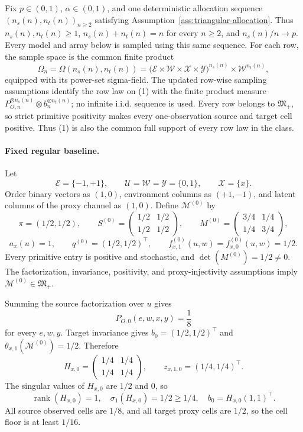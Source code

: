 Fix \(p\in(0,1)\), \(\alpha\in(0,1)\), and one deterministic allocation sequence \((n_s(n),n_t(n))_{n\ge2}\) satisfying Assumption~\ref{ass:triangular-allocation}.  Thus \(n_s(n),n_t(n)\ge1\), \(n_s(n)+n_t(n)=n\) for every \(n\ge2\), and \(n_s(n)/n\to p\).  Every model and array below is sampled using this same sequence.  For each row, the sample space is the common finite product
\[
\Omega_n=\Omega(n_s(n),n_t(n))
=\bigl(\mathcal E\times\mathcal W\times\mathcal X\times\mathcal Y\bigr)^{n_s(n)}
\times\mathcal W^{n_t(n)},
\tag{1}
\]
equipped with its power-set sigma-field.  The updated row-wise sampling assumptions identify the row law on (1) with the finite product measure \(P_{O,n}^{\otimes n_s(n)}\otimes b_n^{\otimes n_t(n)}\); no infinite i.i.d. sequence is used.
Every row belongs to \(\mathfrak M_{+}\), so strict primitive positivity makes every one-observation source and target cell positive.  Thus (1) is also the common full support of every row law in the class.

\paragraph{Fixed regular baseline.}
Let
\[
\mathcal E=\{-1,+1\},\qquad
\mathcal U=\mathcal W=\mathcal Y=\{0,1\},\qquad
\mathcal X=\{x\}.
\]
Order binary vectors as \((1,0)\), environment columns as \((+1,-1)\), and latent columns of the proxy channel as \((1,0)\).  Define \(\mathcal M^{(0)}\) by
\[
\pi=(1/2,1/2),\qquad
S^{(0)}=\begin{pmatrix}1/2&1/2\\1/2&1/2\end{pmatrix},\qquad
M^{(0)}=\begin{pmatrix}3/4&1/4\\1/4&3/4\end{pmatrix},
\]
\[
a_x(u)=1,\qquad q^{(0)}=(1/2,1/2)^{\top},\qquad
f^{(0)}_{x,1}(u,w)=f^{(0)}_{x,0}(u,w)=1/2.
\tag{2}
\]
Every primitive entry is positive and stochastic, and \(\det(M^{(0)})=1/2\ne0\).  The factorization, invariance, positivity, and proxy-injectivity assumptions imply \(\mathcal M^{(0)}\in\mathfrak M_{+}\).

Summing the source factorization over \(u\) gives
\[
P_{O,0}(e,w,x,y)=\frac18
\tag{3}
\]
for every \(e,w,y\).  Target invariance gives \(b_0=(1/2,1/2)^{\top}\) and \(\theta_{x,1}(\mathcal M^{(0)})=1/2\).  Therefore
\[
H_{x,0}=\begin{pmatrix}1/4&1/4\\1/4&1/4\end{pmatrix},
\qquad z_{x,1,0}=(1/4,1/4)^{\top}.
\tag{4}
\]
The singular values of \(H_{x,0}\) are \(1/2\) and \(0\), so
\[
\operatorname{rank}(H_{x,0})=1,
\quad \sigma_1(H_{x,0})=1/2\ge1/4,
\quad b_0=H_{x,0}(1,1)^{\top}.
\tag{5}
\]
All source observed cells are \(1/8\), and all target proxy cells are \(1/2\), so the cell floor is at least \(1/16\).


